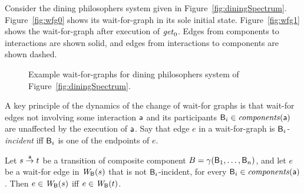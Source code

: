 
Consider the dining philosophers system given in Figure~\ref{fig:diningSpectrum}.
Figure~\ref{fig:wfg0} shows its wait-for-graph in its sole initial state.  Figure~\ref{fig:wfg1}
shows the wait-for-graph after execution of $\mathit{get}_0$.  Edges from components to interactions are
shown solid, and edges from interactions to components are shown dashed.

\begin{figure*}[ht]
  \begin{center}
       \quad
      \caption{Example wait-for-graphs for dining philosophers system of Figure~\ref{fig:diningSpectrum}.}
       \label{fig:wfg}
  \end{center}
\end{figure*}


A key principle of the dynamics of the change of wait-for graphs is that 
wait-for edges not involving some interaction
$\mathsf{a}$ and its participants $\mathsf{B}_i \in \mathit{components}(\mathsf{a})$ are unaffected by the execution
of $\mathsf{a}$.  Say that edge $e$ in a wait-for-graph
is \emph{$\mathsf{B}_i$-incident} iff $\mathsf{B}_i$ is one of the endpoints of $e$.


 \label{prop:wait-for-edge-preservation}
Let $s \stackrel{\mathsf{a}}{\rightarrow} t$ be a transition of composite component $B =
\gamma(\mathsf{B}_1,\dots,\mathsf{B}_n)$, and let $e$ be a wait-for edge in $\mathit{W}_{\mathsf{B}}({s})$
that is not $\mathsf{B}_i$-incident, for every $\mathsf{B}_i \in \mathit{components}(\mathsf{a})$. Then $e \in
\mathit{W}_{\mathsf{B}}({s})$ iff $e \in \mathit{W}_{\mathsf{B}}({t})$. 
\ep
%
%



